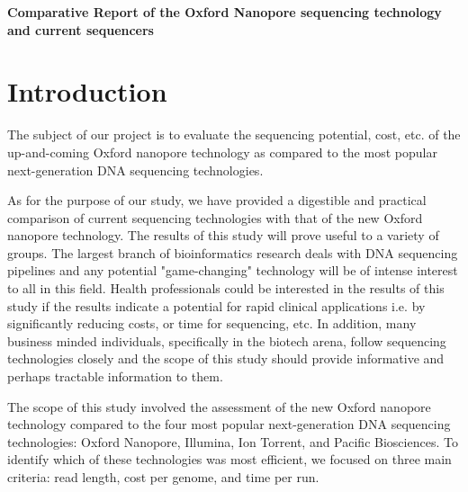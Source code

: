 \documentclass[12pt,letterpaper]{report}
\renewcommand{\thepage}{\roman{page}}%
\begin{document}

\listoffigures
\clearpage


\listoftables
\clearpage


\setcounter{page}{1}
\renewcommand{\thepage}{\arabic{page}}%

\begin{center}
\textbf{\Large{Comparative Report of the Oxford Nanopore sequencing technology and current sequencers}}
\end{center}

\section{Introduction}

The subject of our project is to evaluate the sequencing potential, cost, etc. of the up-and-coming Oxford nanopore technology as compared to the most popular next-generation DNA sequencing technologies.

As for the purpose of our study, we have provided a digestible and practical comparison of current sequencing technologies with that of the new Oxford nanopore technology. The results of this study will prove useful to a variety of groups. The largest branch of bioinformatics research deals with DNA sequencing pipelines and any potential "game-changing" technology will be of intense interest to all in this field. Health professionals could be interested in the results of this study if the results indicate a potential for rapid clinical applications i.e. by significantly reducing costs, or time for sequencing, etc. In addition, many business minded individuals, specifically in the biotech arena, follow sequencing technologies closely and the scope of this study should provide informative and perhaps tractable information to them.

The scope of this study involved the assessment of the new Oxford nanopore technology compared to the four most popular next-generation DNA sequencing technologies: Oxford Nanopore, Illumina, Ion Torrent, and Pacific Biosciences. To identify which of these technologies was most efficient, we focused on three main criteria: read length, cost per genome, and time per run.
\end{document}
